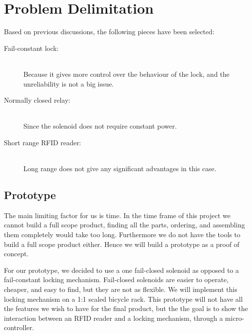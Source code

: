 \section{Problem Delimitation}
Based on previous discussions, the following pieces have been selected:

\begin{description}
  \item[Fail-constant lock:] \hfill \\
  Because it gives more control over the behaviour of the lock, and the unreliability is not a big issue.
  \item[Normally closed relay:] \hfill \\
  Since the solenoid does not require constant power.
  \item[Short range RFID reader:] \hfill \\
  Long range does not give any significant advantages in this case.
\end{description}

\subsection{Prototype}
The main limiting factor for us is time. In the time frame of this project we cannot build a full scope product, finding all the parts, ordering, and assembling them completely would take too long. Furthermore we do not have the tools to build a full scope product either. Hence we will build a prototype as a proof of concept.


For our prototype, we decided to use a one fail-closed solenoid as opposed to a fail-constant locking mechanism. Fail-closed solenoids are easier to operate, cheaper, and easy to find, but they are not as flexible. We will implement this locking mechanism on a 1:1 scaled bicycle rack.
This prototype will not have all the features we wish to have for the final product, but the the goal is to show the interaction between an RFID reader and a locking mechanism, through a micro-controller.

